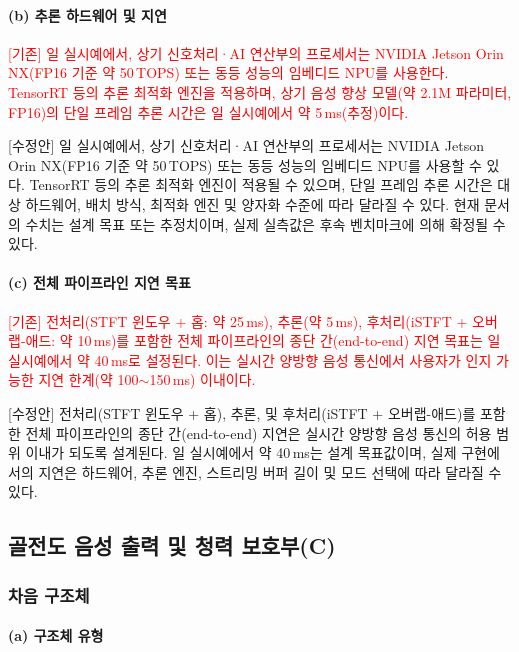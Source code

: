 \documentclass{article}
\newcommand{\reviewold}[1]{{\par\noindent\textcolor{red}{[기존] #1}}}
\newcommand{\reviewnew}[1]{{\par\noindent\textcolor{customblue}{[수정안] #1}}}
\newcommand{\reviewpair}[2]{\reviewold{#1}\reviewnew{#2}\par}
\begin{document}
\paragraph{(b) 추론 하드웨어 및 지연}

\reviewpair{일 실시예에서, 상기 신호처리·AI 연산부의 프로세서는 NVIDIA Jetson Orin NX(FP16 기준 약 50\,TOPS) 또는 동등 성능의 임베디드 NPU를 사용한다. TensorRT 등의 추론 최적화 엔진을 적용하며, 상기 음성 향상 모델(약 2.1M 파라미터, FP16)의 단일 프레임 추론 시간은 일 실시예에서 약 5\,ms(추정)이다.}{일 실시예에서, 상기 신호처리·AI 연산부의 프로세서는 NVIDIA Jetson Orin NX(FP16 기준 약 50\,TOPS) 또는 동등 성능의 임베디드 NPU를 사용할 수 있다. TensorRT 등의 추론 최적화 엔진이 적용될 수 있으며, 단일 프레임 추론 시간은 대상 하드웨어, 배치 방식, 최적화 엔진 및 양자화 수준에 따라 달라질 수 있다. 현재 문서의 수치는 설계 목표 또는 추정치이며, 실제 실측값은 후속 벤치마크에 의해 확정될 수 있다.}

\paragraph{(c) 전체 파이프라인 지연 목표}

\reviewpair{전처리(STFT 윈도우 + 홉: 약 25\,ms), 추론(약 5\,ms), 후처리(iSTFT + 오버랩-애드: 약 10\,ms)를 포함한 전체 파이프라인의 종단 간(end-to-end) 지연 목표는 일 실시예에서 약 40\,ms로 설정된다. 이는 실시간 양방향 음성 통신에서 사용자가 인지 가능한 지연 한계(약 100$\sim$150\,ms) 이내이다.}{전처리(STFT 윈도우 + 홉), 추론, 및 후처리(iSTFT + 오버랩-애드)를 포함한 전체 파이프라인의 종단 간(end-to-end) 지연은 실시간 양방향 음성 통신의 허용 범위 이내가 되도록 설계된다. 일 실시예에서 약 40\,ms는 설계 목표값이며, 실제 구현에서의 지연은 하드웨어, 추론 엔진, 스트리밍 버퍼 길이 및 모드 선택에 따라 달라질 수 있다.}

\subsection{골전도 음성 출력 및 청력 보호부(C)}

\subsubsection{차음 구조체}

\paragraph{(a) 구조체 유형}
\end{document}
